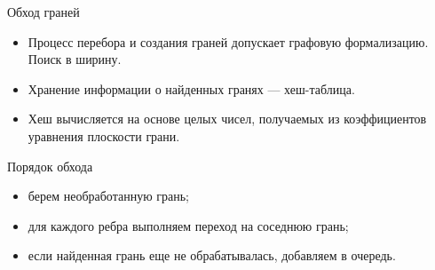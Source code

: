 \documentclass[]{beamer} %
\begin{document}

\begin{frame}{Обход граней}
    \begin{itemize}
        \item Процесс перебора и создания граней допускает графовую формализацию. Поиск в ширину.
        \item Хранение информации о найденных гранях --- хеш-таблица.
        \item Хеш вычисляется на основе целых чисел, получаемых из коэффициентов уравнения плоскости грани.
    \end{itemize}
    \vfill
    \pause
    Порядок обхода
    \begin{itemize}
        \item берем необработанную грань;
        \item для каждого ребра выполняем переход на соседнюю грань;
        \item если найденная грань еще не обрабатывалась, добавляем в очередь.
    \end{itemize}
\end{frame}
\end{document}
